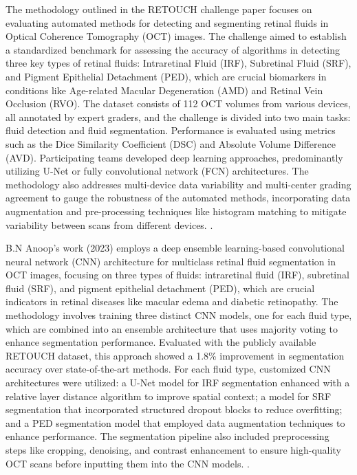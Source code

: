 \documentclass{article}
\begin{document}
The methodology outlined in the RETOUCH challenge paper focuses on evaluating automated methods for detecting and segmenting retinal fluids in Optical Coherence Tomography (OCT) images. The challenge aimed to establish a standardized benchmark for assessing the accuracy of algorithms in detecting three key types of retinal fluids: Intraretinal Fluid (IRF), Subretinal Fluid (SRF), and Pigment Epithelial Detachment (PED), which are crucial biomarkers in conditions like Age-related Macular Degeneration (AMD) and Retinal Vein Occlusion (RVO). The dataset consists of 112 OCT volumes from various devices, all annotated by expert graders, and the challenge is divided into two main tasks: fluid detection and fluid segmentation. Performance is evaluated using metrics such as the Dice Similarity Coefficient (DSC) and Absolute Volume Difference (AVD). Participating teams developed deep learning approaches, predominantly utilizing U-Net or fully convolutional network (FCN) architectures. The methodology also addresses multi-device data variability and multi-center grading agreement to gauge the robustness of the automated methods, incorporating data augmentation and pre-processing techniques like histogram matching to mitigate variability between scans from different devices. \cite{bogunovic2021retouch}.


B.N Anoop's work (2023) employs a deep ensemble learning-based convolutional neural network (CNN) architecture for multiclass retinal fluid segmentation in OCT images, focusing on three types of fluids: intraretinal fluid (IRF), subretinal fluid (SRF), and pigment epithelial detachment (PED), which are crucial indicators in retinal diseases like macular edema and diabetic retinopathy. The methodology involves training three distinct CNN models, one for each fluid type, which are combined into an ensemble architecture that uses majority voting to enhance segmentation performance. Evaluated with the publicly available RETOUCH dataset, this approach showed a 1.8\% improvement in segmentation accuracy over state-of-the-art methods. For each fluid type, customized CNN architectures were utilized: a U-Net model for IRF segmentation enhanced with a relative layer distance algorithm to improve spatial context; a model for SRF segmentation that incorporated structured dropout blocks to reduce overfitting; and a PED segmentation model that employed data augmentation techniques to enhance performance. The segmentation pipeline also included preprocessing steps like cropping, denoising, and contrast enhancement to ensure high-quality OCT scans before inputting them into the CNN models. \cite{rahil2021deep}.
\end{document}
